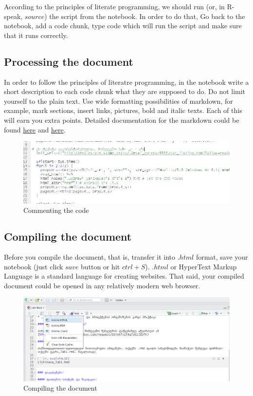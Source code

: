 \documentclass{article}\usepackage[]{graphicx}\usepackage[]{color}
\begin{document}
According to the principles of literate programming, we should run (or, in R-speak, $source$) the script from the notebook. In order to do that, Go back to the notebook, add a code chunk, type code which will run the script and make sure that it runs correctly.

\subsection*{Processing the document}

In order to follow the principles of literatre programming, in the notebook write a short description to each code chunk what they are supposed to do. Do not limit yourself to the plain text. Use wide formatting possibilities of markdown, for example, mark sections, insert links, pictures, bold and italic texts. Each of this will earn you extra points. Detailed documentation for the markdown could be found  \href{https://www.rstudio.com/wp-content/uploads/2016/03/rmarkdown-cheatsheet-2.0.pdf}{here} and  \href{https://github.com/adam-p/markdown-here/wiki/Markdown-Cheatsheet}{here}.

\begin{figure}[h]
\centering
\includegraphics[width=\textwidth]{img/commented.PNG}
\caption{Commenting the code}
    \label{comment}
\end{figure}



\subsection*{Compiling the document}

Before you compile the document, that is, transfer it into $.html$ format, save your notebook (just click $save$ button or hit $ctrl+S$). $.html$ or HyperText Markup Language is a standard language for creating websites. That said, your compiled document could be opened in any relatively modern web browser.

\begin{figure}[h]
\centering
\includegraphics[width=\textwidth]{img/knit_to_html.PNG}
\caption{Compiling the document}
    \label{compile}
\end{figure}
\end{document}
